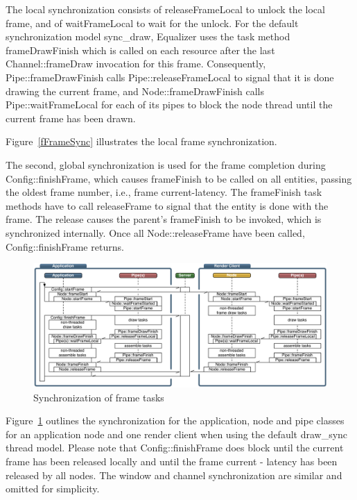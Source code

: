 \documentclass[10pt,a4]{scrartcl}
\newcommand{\fig}[1]{Figure~\ref{#1}}
\begin{document}
The local synchronization consists of \textsf{releaseFrameLocal} to
unlock the local frame, and of \textsf{waitFrameLocal} to wait for the
unlock. For the default synchronization model \textsf{sync\_draw},
Equalizer uses the task method \textsf{frameDrawFinish} which is called
on each resource after the last \textsf{Channel::frameDraw} invocation
for this frame. Consequently, \textsf{Pipe::frameDraw\-Fi\-nish} calls
\textsf{Pipe::\-release\-Frame\-Lo\-cal} to signal that it is done
drawing the current frame, and \textsf{Node::frameDrawFinish} calls
\textsf{Pipe::waitFrameLocal} for each of its pipes to block the node
thread until the current frame has been drawn.

\fig{fFrameSync} illustrates the local frame synchronization.

The second, global synchronization is used for the frame completion
during \textsf{Config::finishFrame}, which causes \textsf{frameFinish}
to be called on all entities, passing the oldest frame number, i.e., frame
\textsf{current-latency}. The \textsf{frameFinish} task methods have to
call \textsf{releaseFrame} to signal that the entity is done with the
frame. The release causes the parent's \textsf{frameFinish} to be
invoked, which is synchronized internally. Once all
\textsf{Node::releaseFrame} have been called,
\textsf{Config::finishFrame} returns.

\begin{figure}[ht!]\center
  \includegraphics[width=\textwidth]{images/mainloop.pdf}
  {\caption{\label{fMainLoop}Synchronization of frame tasks}}
\end{figure}

\fig{fMainLoop} outlines the synchronization for the application, node
and pipe classes for an application node and one render client when
using the default \textsf{draw\_sync} thread model. Please note that
\textsf{Config::finishFrame} does block until the current frame has been
released locally and until the frame \textsf{current - latency} has been
released by all nodes. The window and channel synchronization are
similar and omitted for simplicity.
\end{document}
